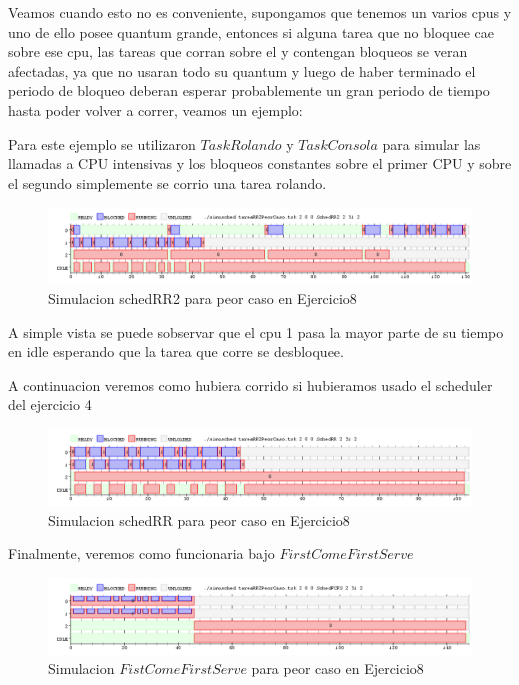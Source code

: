 \documentclass[11pt]{article}
\begin{document}
  Veamos cuando esto no es conveniente, supongamos que tenemos un varios cpus y uno de ello posee quantum grande, entonces si alguna tarea que no bloquee cae sobre ese cpu, las tareas que corran sobre el y contengan bloqueos se veran afectadas, ya que no usaran todo su quantum y luego de haber terminado el periodo de bloqueo deberan esperar probablemente un gran periodo de tiempo hasta poder volver a correr, veamos un ejemplo: 

  Para este ejemplo se utilizaron $TaskRolando$ y $TaskConsola$ para simular las llamadas a CPU intensivas y los bloqueos constantes sobre el primer CPU y sobre el segundo simplemente se corrio una tarea rolando.

    \begin{figure}[H]
      \includegraphics[scale=0.5]{Ej8PeorCaso}
      \caption{Simulacion schedRR2 para peor caso en Ejercicio8}
    \end{figure}

  A simple vista se puede sobservar que el cpu 1 pasa la mayor parte de su tiempo en idle esperando que la tarea que corre se desbloquee. 

  A continuacion veremos como hubiera corrido si hubieramos usado el scheduler del ejercicio 4

    \begin{figure}[H]
      \includegraphics[scale=0.5]{Ej8PeorCasoRR}
      \caption{Simulacion schedRR para peor caso en Ejercicio8}
    \end{figure}

  Finalmente, veremos como funcionaria bajo $First Come First Serve$

    \begin{figure}[H]
      \includegraphics[scale=0.5]{Ej8PeorCasoFCFS}
      \caption{Simulacion $Fist Come First Serve$ para peor caso en Ejercicio8}
    \end{figure}
\end{document}
